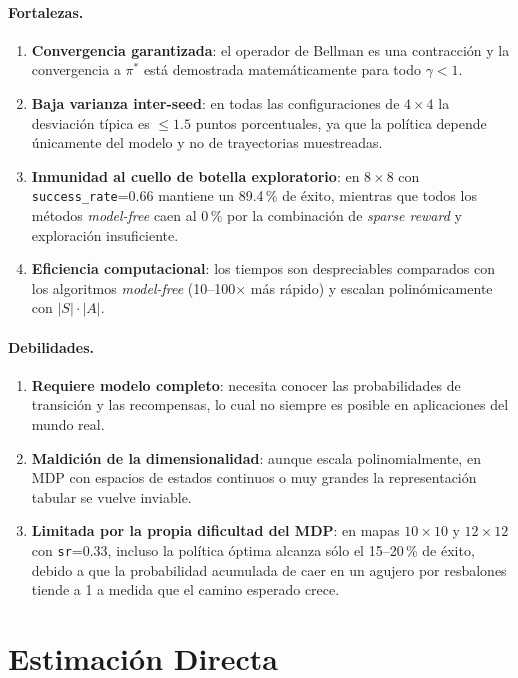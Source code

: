 \documentclass[11pt,a4paper]{article}
\begin{document}
\paragraph{Fortalezas.}
\begin{enumerate}
  \item \textbf{Convergencia garantizada}: el operador de Bellman es una contracción y la convergencia a $\pi^{\ast}$ está demostrada matemáticamente para todo $\gamma<1$.
  \item \textbf{Baja varianza inter-seed}: en todas las configuraciones de $4\times 4$ la desviación típica es $\leq 1.5$ puntos porcentuales, ya que la política depende únicamente del modelo y no de trayectorias muestreadas.
  \item \textbf{Inmunidad al cuello de botella exploratorio}: en $8\times 8$ con \texttt{success\_rate}=0.66 mantiene un 89.4\,\% de éxito, mientras que todos los métodos \emph{model-free} caen al 0\,\% por la combinación de \emph{sparse reward} y exploración insuficiente.
  \item \textbf{Eficiencia computacional}: los tiempos son despreciables comparados con los algoritmos \emph{model-free} (10--100$\times$ más rápido) y escalan polinómicamente con $|S|\cdot|A|$.
\end{enumerate}

\paragraph{Debilidades.}
\begin{enumerate}
  \item \textbf{Requiere modelo completo}: necesita conocer las probabilidades de transición y las recompensas, lo cual no siempre es posible en aplicaciones del mundo real.
  \item \textbf{Maldición de la dimensionalidad}: aunque escala polinomialmente, en MDP con espacios de estados continuos o muy grandes la representación tabular se vuelve inviable.
  \item \textbf{Limitada por la propia dificultad del MDP}: en mapas $10\times 10$ y $12\times 12$ con \texttt{sr}=0.33, incluso la política óptima alcanza sólo el 15--20\,\% de éxito, debido a que la probabilidad acumulada de caer en un agujero por resbalones tiende a 1 a medida que el camino esperado crece.
\end{enumerate}

\section{Estimación Directa}
\end{document}
